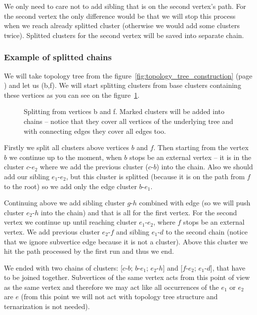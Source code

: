 We only need to care not to add sibling that is on the second vertex's path.
For the second vertex the only difference would be that we will stop this
process when we reach already splitted cluster (otherwise we would add some
clusters twice). Splitted clusters for the second vertex will be saved into
separate chain.

\subsubsection{Example of splitted chains}

We will take topology tree from the figure~\ref{fig:topology_tree_construction}
(page \pageref{fig:topology_tree_construction}) and let us \Expose(b,f). We will
start splitting clusters from base clusters containing these vertices as you
can see on the figure~\ref{fig:chain_clusters_example}.

\begin{figure}[H]
\centering
{}
\caption[Splitting clusters into chains]
{Splitting from vertices b and f. Marked clusters will be added into
chains -- notice that they cover all vertices of the underlying tree and with
connecting edges they cover all edges too.}
\label{fig:chain_clusters_example}
\end{figure}

Firstly we split all clusters above vertices $b$ and $f$. Then starting from the
vertex $b$ we continue up to the moment, when $b$ stops be an external vertex
-- it is in the cluster $c$-$e_2$ where we add the previous cluster ($c$-$b$)
into the chain. Also we should add our sibling $e_1$-$e_2$, but this cluster is
splitted (because it is on the path from $f$ to the root) so we add only the
edge cluster $b$-$e_1$.

Continuing above we add sibling cluster $g$-$h$ combined with edge (so we will
push cluster $e_2$-$h$ into the chain) and that is all for the first vertex.
For the second vertex we continue up until reaching cluster $e_1$-$e_2$, where
$f$ stops be an external vertex. We add previous cluster $e_2$-$f$ and sibling
$e_1$-$d$ to the second chain (notice that we ignore subvertice edge because it
is not a cluster). Above this cluster we hit the path processed by the first run
and thus we end.

We ended with two chains of clusters: [$c$-$b$; $b$-$e_1$; $e_2$-$h$] and
[$f$-$e_2$; $e_1$-$d$], that have to be joined together. Subvertices
of the same vertex acts from this point of view as the same vertex and therefore
we may act like all occurrences of the $e_1$ or $e_2$ are $e$ (from this point
we will not act with topology tree structure and ternarization is not needed).

